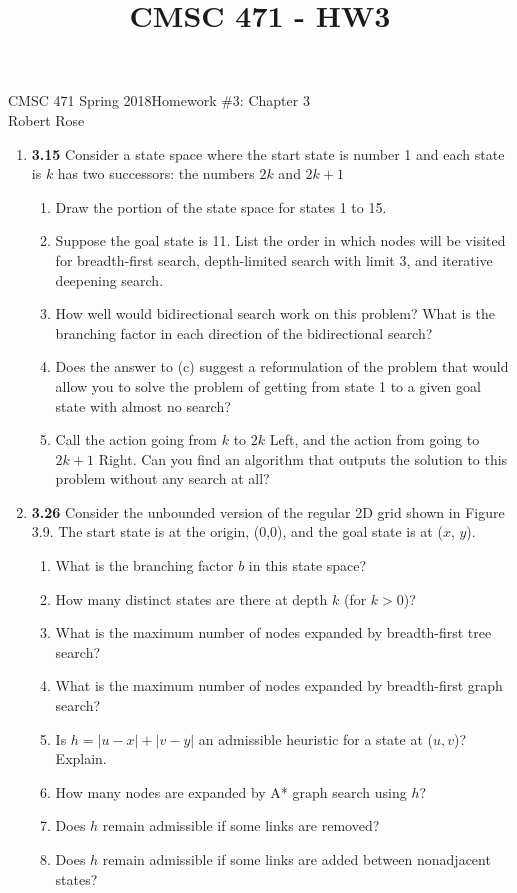 \documentclass[12pt]{article}
\title{CMSC 471 - HW3}
\begin{document}
CMSC 471 Spring 2018\hfill Homework \#3: Chapter 3\\
Robert Rose

\hrulefill

\begin{enumerate}
\item \textbf{3.15} Consider a state space where the start state is number 1 and each state is $k$ has two successors: the numbers $2k$ and $2k + 1$
  \begin{enumerate}
  \item Draw the portion of the state space for states 1 to 15.
  \item Suppose the goal state is 11. List the order in which nodes will be visited for breadth-first search, depth-limited search with limit 3, and iterative deepening search.
  \item How well would bidirectional search work on this problem? What is the branching factor in each direction of the bidirectional search?
  \item Does the answer to (c) suggest a reformulation of the problem that would allow you to solve the problem of getting from state 1 to a given goal state with almost no search?
  \item Call the action going from $k$ to $2k$ Left, and the action from going to $2k + 1$ Right. Can you find an algorithm that outputs the solution to this problem without any search at all?
  \end{enumerate}
\newpage

\item \textbf{3.26} Consider the unbounded version of the regular 2D grid shown in Figure 3.9. The start state is at the origin, (0,0), and the goal state is at ($x$, $y$).
  \begin{enumerate}
  \item What is the branching factor $b$ in this state space?
  \item How many distinct states are there at depth $k$ (for $k > 0$)?
  \item What is the maximum number of nodes expanded by breadth-first tree search?
  \item What is the maximum number of nodes expanded by breadth-first graph search?
  \item Is $h = \left|u - x\right| + \left|v - y\right|$ an admissible heuristic for a state at ($u, v$)? Explain.
  \item How many nodes are expanded by A* graph search using $h$?
  \item Does $h$ remain admissible if some links are removed?
  \item Does $h$ remain admissible if some links are added between nonadjacent states?
  \end{enumerate}

\end{enumerate}
\end{document}
